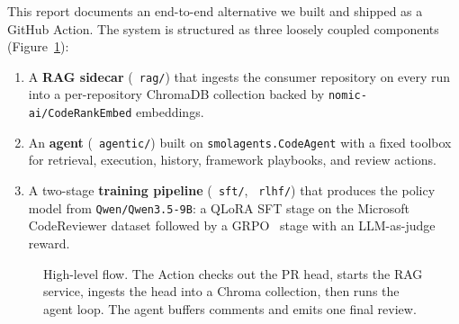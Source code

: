 \documentclass[11pt,a4paper]{article}
\newcommand{\code}[1]{\texttt{\small #1}}
\renewcommand{\path}[1]{\texttt{\small\color{mute} #1}}
\begin{document}
This report documents an end-to-end alternative we built and shipped as a
GitHub Action. The system is structured as three loosely coupled components
(Figure~\ref{fig:overview}):
\begin{enumerate}[leftmargin=*]
  \item A \textbf{RAG sidecar} (\path{rag/}) that ingests the consumer
        repository on every run into a per-repository ChromaDB collection
        backed by \code{nomic-ai/CodeRankEmbed} embeddings.
  \item An \textbf{agent} (\path{agentic/}) built on
        \code{smolagents.CodeAgent} with a fixed toolbox for retrieval,
        execution, history, framework playbooks, and review actions.
  \item A two-stage \textbf{training pipeline}
        (\path{sft/}, \path{rlhf/}) that produces the policy model from
        \code{Qwen/Qwen3.5-9B}: a QLoRA SFT stage on the Microsoft
        CodeReviewer dataset followed by a GRPO~\cite{shao2024deepseekmath}
        stage with an LLM-as-judge reward.
\end{enumerate}

\begin{figure}[h]
\centering
{}
\caption{High-level flow. The Action checks out the PR head, starts the RAG
service, ingests the head into a Chroma collection, then runs the agent
loop. The agent buffers comments and emits one final review.}
\label{fig:overview}
\end{figure}
\end{document}
